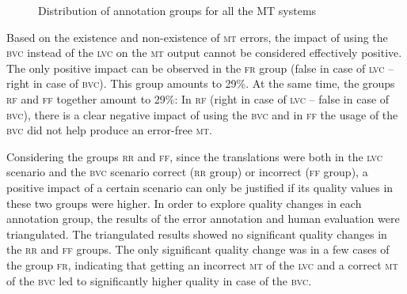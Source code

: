\documentclass[output=paper]{langsci/langscibook}
\begin{document}
\begin{figure}

\caption{Distribution of annotation groups for all the MT systems}
\label{marzouk:fig2}
\end{figure}



Based on the existence and non-existence of \textsc{mt} errors, the impact of using the \textsc{bvc} instead of the \textsc{lvc} on the \textsc{mt} output cannot be considered effectively positive. The only positive impact can be observed in the \textsc{fr} group (false in case of \textsc{lvc} -- right in case of \textsc{bvc}). This group amounts to 29\%. At the same time, the groups \textsc{rf} and \textsc{ff} together amount to 29\%: In \textsc{rf} (right in case of \textsc{lvc} -- false in case of \textsc{bvc}), there is a clear negative impact of using the \textsc{bvc} and in \textsc{ff} the usage of the \textsc{bvc} did not help produce an error-free \textsc{mt}.

Considering the groups \textsc{rr} and \textsc{ff}, since the translations were both in the \textsc{lvc} scenario and the \textsc{bvc} scenario correct (\textsc{rr} group) or incorrect (\textsc{ff} group), a positive impact of a certain scenario can only be justified if its quality values in these two groups were higher. In order to explore quality changes in each annotation group, the results of the error annotation and human evaluation were triangulated. The triangulated results showed no significant quality changes in the \textsc{rr} and \textsc{ff} groups. The only significant quality change was in a few cases of the group \textsc{fr}, indicating that getting an incorrect \textsc{mt} of the \textsc{lvc} and a correct \textsc{mt} of the \textsc{bvc} led to significantly higher quality in case of the \textsc{bvc}. 
\end{document}
